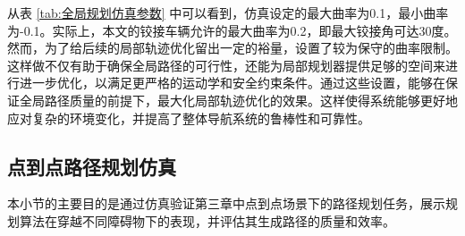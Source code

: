 \documentclass[master,academic]{ysuthesis} %
\begin{document}
	从表 \ref{tab:全局规划仿真参数} 中可以看到，仿真设定的最大曲率为0.1，最小曲率为-0.1。实际上，本文的铰接车辆允许的最大曲率为0.2，即最大铰接角可达30度。然而，为了给后续的局部轨迹优化留出一定的裕量，设置了较为保守的曲率限制。这样做不仅有助于确保全局路径的可行性，还能为局部规划器提供足够的空间来进行进一步优化，以满足更严格的运动学和安全约束条件。通过这些设置，能够在保证全局路径质量的前提下，最大化局部轨迹优化的效果。这样使得系统能够更好地应对复杂的环境变化，并提高了整体导航系统的鲁棒性和可靠性。

		\subsection{点到点路径规划仿真}
		本小节的主要目的是通过仿真验证第三章中点到点场景下的路径规划任务，展示规划算法在穿越不同障碍物下的表现，并评估其生成路径的质量和效率。
		
\end{document}
